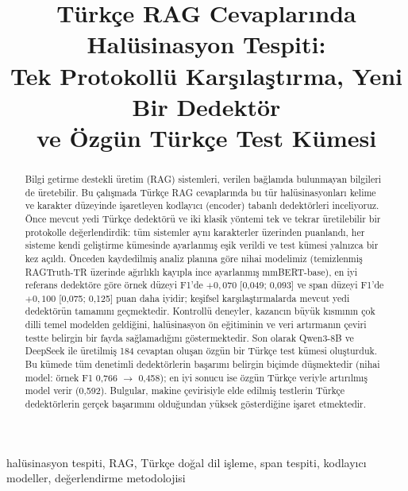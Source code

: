 \documentclass[conference,a4paper]{IEEEtran}
\begin{document}
\title{Türkçe RAG Cevaplarında Halüsinasyon Tespiti:\\ Tek Protokollü Karşılaştırma, Yeni Bir Dedektör\\ ve Özgün Türkçe Test Kümesi}

\author{
}

\maketitle

\begin{abstract}
Bilgi getirme destekli üretim (RAG) sistemleri, verilen bağlamda bulunmayan bilgileri de üretebilir. Bu çalışmada Türkçe RAG cevaplarında bu tür halüsinasyonları kelime ve karakter düzeyinde işaretleyen kodlayıcı (encoder) tabanlı dedektörleri inceliyoruz. Önce mevcut yedi Türkçe dedektörü ve iki klasik yöntemi tek ve tekrar üretilebilir bir protokolle değerlendirdik: tüm sistemler aynı karakterler üzerinden puanlandı, her sisteme kendi geliştirme kümesinde ayarlanmış eşik verildi ve test kümesi yalnızca bir kez açıldı. Önceden kaydedilmiş analiz planına göre nihai modelimiz (temizlenmiş RAGTruth-TR üzerinde ağırlıklı kayıpla ince ayarlanmış mmBERT-base), en iyi referans dedektöre göre örnek düzeyi F1'de $+0{,}070$ [0{,}049; 0{,}093] ve span düzeyi F1'de $+0{,}100$ [0{,}075; 0{,}125] puan daha iyidir; keşifsel karşılaştırmalarda mevcut yedi dedektörün tamamını geçmektedir. Kontrollü deneyler, kazancın büyük kısmının çok dilli temel modelden geldiğini, halüsinasyon ön eğitiminin ve veri artırmanın çeviri testte belirgin bir fayda sağlamadığını göstermektedir. Son olarak Qwen3-8B ve DeepSeek ile üretilmiş 184 cevaptan oluşan özgün bir Türkçe test kümesi oluşturduk. Bu kümede tüm denetimli dedektörlerin başarımı belirgin biçimde düşmektedir (nihai model: örnek F1 0{,}766 $\rightarrow$ 0{,}458); en iyi sonucu ise özgün Türkçe veriyle artırılmış model verir (0{,}592). Bulgular, makine çevirisiyle elde edilmiş testlerin Türkçe dedektörlerin gerçek başarımını olduğundan yüksek gösterdiğine işaret etmektedir.
\end{abstract}

\begin{IEEEkeywords}
halüsinasyon tespiti, RAG, Türkçe doğal dil işleme, span tespiti, kodlayıcı modeller, değerlendirme metodolojisi
\end{IEEEkeywords}
\end{document}
